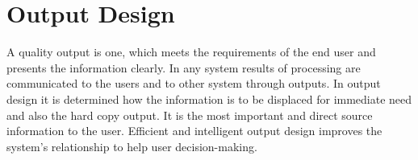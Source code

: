 \section{Output Design}
A quality output is one, which meets the requirements of the end user and presents the information clearly. In any system results of processing are communicated to the users and to other system through outputs. In output design it is determined how the information is to be displaced for immediate need and also the hard copy output. It is the most important and direct source information to the user. Efficient and intelligent output design improves the system’s relationship to help user decision-making.
















